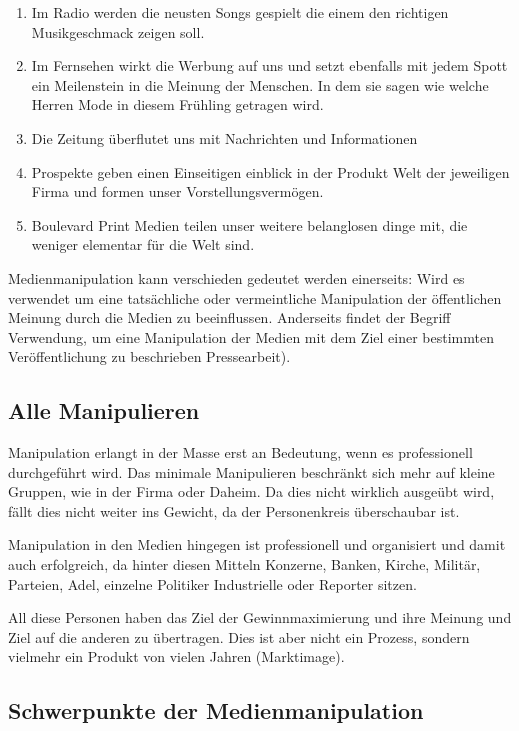 \begin{enumerate}
	\item Im Radio werden die neusten Songs gespielt die einem den richtigen Musikgeschmack zeigen
soll.
	\item Im Fernsehen wirkt die Werbung auf uns und setzt ebenfalls mit jedem Spott ein Meilenstein
in die Meinung der Menschen. In dem sie \zB sagen wie welche Herren Mode in diesem Frühling getragen
wird.
	\item Die Zeitung überflutet uns mit Nachrichten und Informationen
	\item Prospekte geben einen Einseitigen einblick in der Produkt Welt der jeweiligen Firma und
formen unser Vorstellungsvermögen.
	\item Boulevard Print Medien teilen unser weitere belanglosen dinge mit, die weniger elementar
für die Welt sind.
\end{enumerate}

Medienmanipulation kann verschieden gedeutet werden einerseits:
Wird es verwendet um eine tatsächliche oder vermeintliche Manipulation der öffentlichen Meinung durch
die Medien zu beeinflussen.
Anderseits findet der Begriff Verwendung, um eine Manipulation der Medien mit dem Ziel einer
bestimmten Veröffentlichung zu beschrieben  Pressearbeit).

\subsection{Alle Manipulieren}
Manipulation erlangt in der Masse erst an Bedeutung, wenn es professionell durchgeführt wird. Das
minimale Manipulieren beschränkt sich mehr auf kleine Gruppen, wie in der Firma oder Daheim. Da dies
nicht wirklich ausgeübt wird, fällt dies nicht weiter ins Gewicht, da der Personenkreis überschaubar
ist.

Manipulation in den Medien hingegen ist professionell und organisiert und damit auch erfolgreich, da
hinter diesen Mitteln Konzerne, Banken, Kirche, Militär, Parteien, Adel, einzelne Politiker
Industrielle oder Reporter sitzen.

All diese Personen haben das Ziel der Gewinnmaximierung und ihre Meinung und Ziel auf die anderen zu
übertragen. Dies ist aber nicht ein Prozess, sondern vielmehr ein Produkt von vielen Jahren
(Marktimage).


\subsection{Schwerpunkte der Medienmanipulation}

